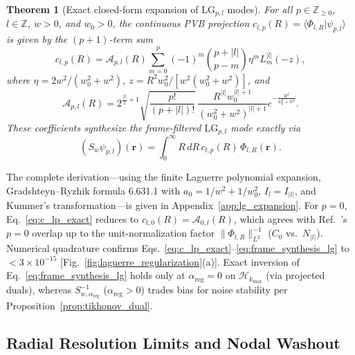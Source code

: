 \documentclass[aps,pra,reprint,amsmath,amssymb,floatfix,longbibliography]{revtex4-2}
\providecommand{\braket}[2]{\langle#1\vert#2\rangle}
\providecommand{\abs}[1]{\lvert#1\rvert}
\providecommand{\norm}[1]{\lVert#1\rVert}
\newtheorem{theorem}{Theorem}
\begin{document}
\begin{theorem}[Exact closed-form expansion of $\mathrm{LG}_{p,l}$ modes]
\label{thm:c_lp_exact}
For all $p \in \mathbb{Z}_{\ge 0}$, $l \in \mathbb{Z}$, $w > 0$, and $w_0 > 0$, the continuous PVB projection $c_{l,p}(R) = \braket{\Phi_{l,R}}{\psi_{p,l}}$ is given by the $(p+1)$-term sum
\begin{equation}
c_{l,p}(R) = \mathcal{A}_{p,l}(R) \sum_{m=0}^p (-1)^m \binom{p+\abs{l}}{p-m} \eta^m L_m^{\abs{l}}(-z),
\label{eq:c_lp_exact}
\end{equation}
where $\eta = 2w^2/(w_0^2 + w^2)$, $z = R^2 w_0^2/[w^2(w_0^2 + w^2)]$, and
\begin{equation}
\mathcal{A}_{p,l}(R) = 2^{\frac{\abs{l}}{2}+1}\sqrt{\frac{p!}{(p+\abs{l})!}}\,\frac{R^{\abs{l}} w_0^{\abs{l}+1}}{(w_0^2 + w^2)^{\abs{l}+1}} e^{-\frac{R^2}{w_0^2 + w^2}}.
\label{eq:A_prefactor}
\end{equation}
These coefficients synthesize the frame-filtered $\mathrm{LG}_{p,l}$ mode exactly via
\begin{equation}
(S_w\psi_{p,l})(\mathbf{r}) = \int_0^\infty R\,dR\, c_{l,p}(R)\,\Phi_{l,R}(\mathbf{r}).
\label{eq:frame_synthesis_lg}
\end{equation}
\end{theorem}

The complete derivation—using the finite Laguerre polynomial expansion, Gradshteyn--Ryzhik formula 6.631.1 with $a_0 = 1/w^2 + 1/w_0^2$, $I_l = I_{\abs{l}}$, and Kummer's transformation—is given in Appendix~\ref{app:lg_expansion}. For $p=0$, Eq.~\eqref{eq:c_lp_exact} reduces to $c_{l,0}(R) = \mathcal{A}_{0,l}(R)$, which agrees with Ref.~\cite{Ferreira2026}'s $p=0$ overlap up to the unit-normalization factor $\norm{\Phi_{l,R}}_{L^2}^{-1}$ ($C_0$ vs.\ $N_{\abs{l}}$). Numerical quadrature confirms Eqs.~\eqref{eq:c_lp_exact}--\eqref{eq:frame_synthesis_lg} to $<3 \times 10^{-15}$ [Fig.~\ref{fig:laguerre_regularization}(a)]. Exact inversion of Eq.~\eqref{eq:frame_synthesis_lg} holds only at $\alpha_{\mathrm{reg}}=0$ on $\mathcal{H}_{k_{\max}}$ (via projected duals), whereas $S_{w,\alpha_{\mathrm{reg}}}^{-1}$ ($\alpha_{\mathrm{reg}} > 0$) trades bias for noise stability per Proposition~\ref{prop:tikhonov_dual}.

\subsection{Radial Resolution Limits and Nodal Washout}
\label{subsec:nodal_washout}
\end{document}

